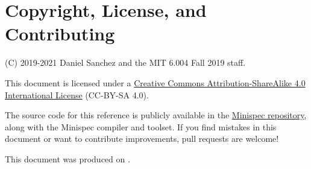 \section{Copyright, License, and Contributing}

(C) 2019-2021 Daniel Sanchez and the MIT 6.004 Fall 2019 staff.

This document is licensed under a \href{http://creativecommons.org/licenses/by-sa/4.0/}{Creative Commons Attribution-ShareAlike 4.0 International License} (CC-BY-SA 4.0).

The source code for this reference is publicly available in the \href{https://github.com/minispec-hdl/minispec/}{Minispec repository},
along with the Minispec compiler and toolset.
If you find mistakes in this document or want to contribute improvements, pull requests are welcome!

This document was produced on .
